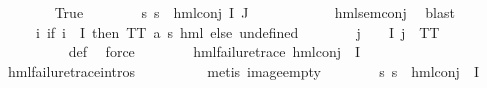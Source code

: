 \begin{isabellebody}
\ \ \ \ \ \ \isamarkupfalse%
\ True\isanewline
\ \ \ \ \ \ \isamarkupfalse%
\ {\isachardoublequoteopen}{\isasymforall}s{\isachardot}{\kern0pt}\ {\isacharparenleft}{\kern0pt}{\isasymnot}{\isacharparenleft}{\kern0pt}s\ {\isasymTurnstile}\ hml{\isacharunderscore}{\kern0pt}conj\ I\ J\ {\isasymPhi}{\isacharparenright}{\kern0pt}{\isacharparenright}{\kern0pt}{\isachardoublequoteclose}\ \isanewline
\ \ \ \ \ \ \ \ \isamarkupfalse%
\ hml{\isacharunderscore}{\kern0pt}sem{\isacharunderscore}{\kern0pt}conj\ \isamarkupfalse%
\ blast\isanewline
\ \ \ \ \ \ \isamarkupfalse%
\ {\isasymPsi}\ \ {\isachardoublequoteopen}{\isasymPsi}\ {\isasymequiv}\ {\isacharparenleft}{\kern0pt}{\isasymlambda}i{\isachardot}{\kern0pt}\ {\isacharparenleft}{\kern0pt}if\ i\ {\isasymin}\ I\ then\ TT{\isacharcolon}{\kern0pt}{\isacharcolon}{\kern0pt}\ {\isacharparenleft}{\kern0pt}{\isacharprime}{\kern0pt}a{\isacharcomma}{\kern0pt}\ {\isacharprime}{\kern0pt}s{\isacharparenright}{\kern0pt}\ hml\ else\ undefined{\isacharparenright}{\kern0pt}{\isacharparenright}{\kern0pt}{\isachardoublequoteclose}\isanewline
\ \ \ \ \ \ \isamarkupfalse%
\ {\isachardoublequoteopen}{\isasymforall}j\ {\isasymin}\ {\isasymPsi}\ {\isacharbackquote}{\kern0pt}\ I{\isachardot}{\kern0pt}\ j\ {\isacharequal}{\kern0pt}\ TT{\isachardoublequoteclose}\ \isanewline
\ \ \ \ \ \ \ \ \isamarkupfalse%
\ {\isasymPsi}{\isacharunderscore}{\kern0pt}def\ \isamarkupfalse%
\ force\isanewline
\ \ \ \ \ \ \isamarkupfalse%
\ {\isachardoublequoteopen}hml{\isacharunderscore}{\kern0pt}failure{\isacharunderscore}{\kern0pt}trace\ {\isacharparenleft}{\kern0pt}hml{\isacharunderscore}{\kern0pt}conj\ {\isacharbraceleft}{\kern0pt}{\isacharbraceright}{\kern0pt}\ I\ {\isasymPsi}{\isacharparenright}{\kern0pt}{\isachardoublequoteclose}\ \isamarkupfalse%
\ hml{\isacharunderscore}{\kern0pt}failure{\isacharunderscore}{\kern0pt}trace{\isachardot}{\kern0pt}intros{\isacharparenleft}{\kern0pt}{}{\isacharparenright}{\kern0pt}\isanewline
\ \ \ \ \ \ \ \ \isamarkupfalse%
\ {\isacharparenleft}{\kern0pt}metis\ image{\isacharunderscore}{\kern0pt}empty{\isacharparenright}{\kern0pt}\isanewline
\ \ \ \ \ \ \isamarkupfalse%
\ {\isachardoublequoteopen}{\isasymforall}s{\isachardot}{\kern0pt}\ {\isacharparenleft}{\kern0pt}{\isasymnot}{\isacharparenleft}{\kern0pt}s\ {\isasymTurnstile}\ hml{\isacharunderscore}{\kern0pt}conj\ {\isacharbraceleft}{\kern0pt}{\isacharbraceright}{\kern0pt}\ I\ {\isasymPsi}{\isacharparenright}{\kern0pt}{\isacharparenright}{\kern0pt}{\isachardoublequoteclose}\ \isanewline

\end{isabellebody}
